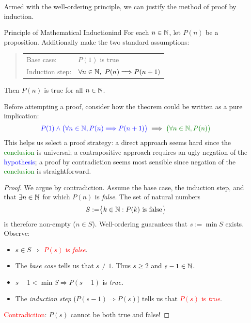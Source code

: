 \goodbreak  

Armed with the well-ordering principle, we can justify the method of proof by induction. 

\begin{thm}{Principle of Mathematical Induction}{ind}
	For each $n\in\mathbb{N}$, let $P(n)$ be a proposition. Additionally make the two standard assumptions:
	\begin{quote}
		\begin{tabular}{@{}ll}
			Base case: &$P(1)$ is true\\[5pt]
			Induction step: &$\forall n\in\mathbb{N},\ P(n)\Longrightarrow P(n+1)$
		\end{tabular}
	\end{quote}
	Then $P(n)$ is true for all $n\in\mathbb{N}$.
\end{thm}

Before attempting a proof, consider how the theorem could be written as a pure implication:
\[
	\textcolor{blue}{P(1)\wedge\bigl(\forall n\in\N,P(n)\Longrightarrow P(n+1)\bigr)}\implies \textcolor{Green}{\bigl(\forall n\in\N, P(n)\bigr)}
\]
This helps us select a proof strategy: a direct approach seems hard since the \textcolor{Green}{conclusion} is universal; a contrapositive approach requires an ugly negation of the \textcolor{blue}{hypothesis}; a proof by contradiction seems most sensible since negation of the \textcolor{Green}{conclusion} is straightforward.

\begin{proof}
	We argue by contradiction. Assume the base case, the induction step, and that $\exists n\in\mathbb{N}$ for which $P(n)$ is \emph{false.} The set of natural numbers
	\[
		S:=\bigr\{k\in\mathbb{N}:P(k)\text{ is false}\bigr\}
	\]
	is therefore non-empty ($n\in S$). Well-ordering guarantees that $s:=\min S$ exists. Observe:
	\begin{itemize}\itemsep0pt\parskip2pt
	  \item $s\in S\Longrightarrow$ \textcolor{red}{$P(s)$ is \emph{false}}.
	  \item The \emph{base case} tells us that $s\neq 1$. Thus $s\ge 2$ and $s-1\in\mathbb{N}$.
	  \item $s-1<\min S\Longrightarrow P(s-1)$ is \emph{true.}
	  \item The \emph{induction step} ($P(s-1)\Longrightarrow P(s)$) tells us that \textcolor{red}{$P(s)$ is \emph{true}}.
	\end{itemize}
	\textcolor{red}{Contradiction}: $P(s)$ cannot be both true and false!
\end{proof}


